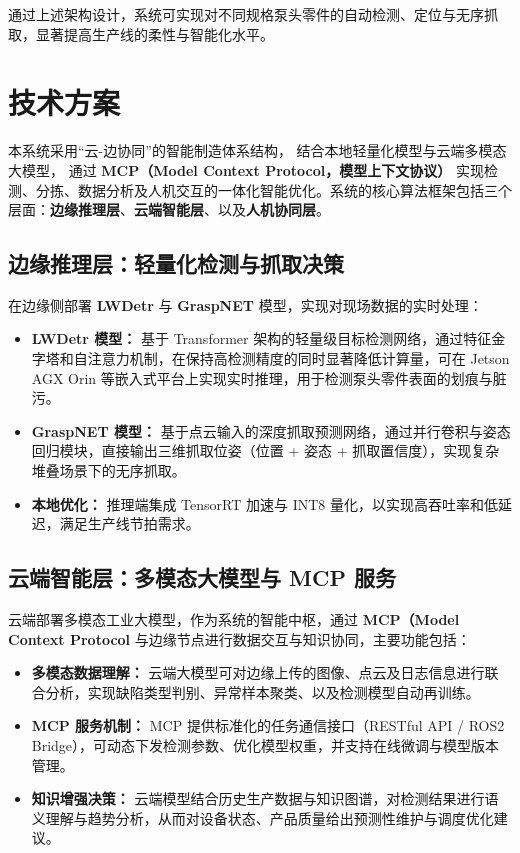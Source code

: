\documentclass{cumcmthesis}
\begin{document}
通过上述架构设计，系统可实现对不同规格泵头零件的自动检测、定位与无序抓取，显著提高生产线的柔性与智能化水平。


\section{技术方案}

本系统采用“云-边协同”的智能制造体系结构，
结合本地轻量化模型与云端多模态大模型，
通过 \textbf{MCP（Model Context Protocol，模型上下文协议）} 实现检测、分拣、数据分析及人机交互的一体化智能优化。系统的核心算法框架包括三个层面：\textbf{边缘推理层}、\textbf{云端智能层}、以及\textbf{人机协同层}。

\subsection{边缘推理层：轻量化检测与抓取决策}

在边缘侧部署 \textbf{LWDetr} 与 \textbf{GraspNET} 模型，实现对现场数据的实时处理：

\begin{itemize}
    \item \textbf{LWDetr 模型：}  
    基于 Transformer 架构的轻量级目标检测网络，通过特征金字塔和自注意力机制，在保持高检测精度的同时显著降低计算量，可在 Jetson AGX Orin 等嵌入式平台上实现实时推理，用于检测泵头零件表面的划痕与脏污。

    \item \textbf{GraspNET 模型：}  
    基于点云输入的深度抓取预测网络，通过并行卷积与姿态回归模块，直接输出三维抓取位姿（位置 + 姿态 + 抓取置信度），实现复杂堆叠场景下的无序抓取。

    \item \textbf{本地优化：}  
    推理端集成 TensorRT 加速与 INT8 量化，以实现高吞吐率和低延迟，满足生产线节拍需求。
\end{itemize}

\subsection{云端智能层：多模态大模型与 MCP 服务}

云端部署多模态工业大模型，作为系统的智能中枢，通过 \textbf{MCP（Model Context Protocol} 与边缘节点进行数据交互与知识协同，主要功能包括：

\begin{itemize}
    \item \textbf{多模态数据理解：}  
    云端大模型可对边缘上传的图像、点云及日志信息进行联合分析，实现缺陷类型判别、异常样本聚类、以及检测模型自动再训练。

    \item \textbf{MCP 服务机制：}  
    MCP 提供标准化的任务通信接口（RESTful API / ROS2 Bridge），可动态下发检测参数、优化模型权重，并支持在线微调与模型版本管理。

    \item \textbf{知识增强决策：}  
    云端模型结合历史生产数据与知识图谱，对检测结果进行语义理解与趋势分析，从而对设备状态、产品质量给出预测性维护与调度优化建议。
\end{itemize}
\end{document}
